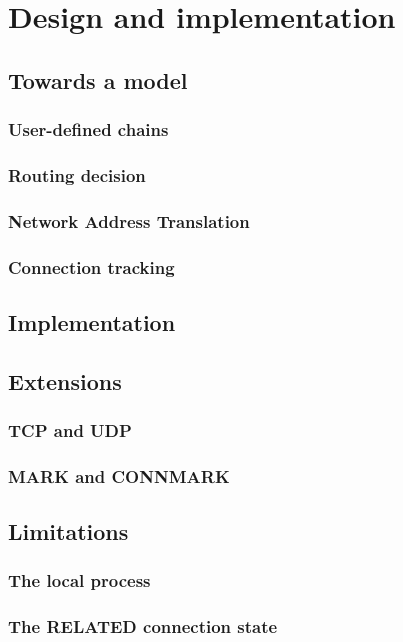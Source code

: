 \chapter{Design and implementation}\label{chapter:design}

\section{Towards a model}
\subsection{User-defined chains}
\subsection{Routing decision}
\subsection{Network Address Translation}
\subsection{Connection tracking}

\section{Implementation}

\section{Extensions}
\subsection{TCP and UDP}
\subsection{MARK and CONNMARK}

\section{Limitations}
\subsection{The local process}
\subsection{The RELATED connection state}
